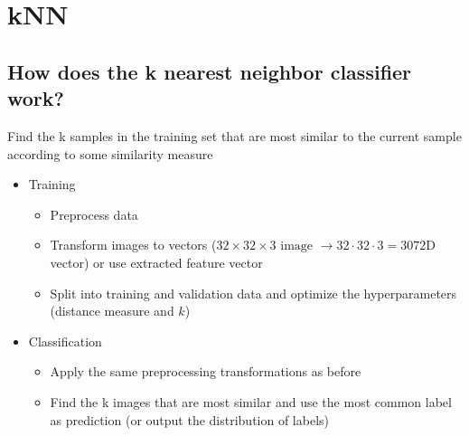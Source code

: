 %
\section{kNN}
\subsection{How does the k nearest neighbor classifier work?}
Find the k samples in the training set that are most similar to the current sample according to some similarity measure

\begin{itemize}
\item Training
\begin{itemize}
\item Preprocess data 
\item Transform images to vectors ($32\times 32\times 3 \text{ image }\to 32\cdot 32\cdot 3 = 3072$D vector) or use extracted feature vector
\item Split into training and validation data and optimize the hyperparameters (distance measure and $k$)
\end{itemize}
\item Classification
\begin{itemize}
\item Apply the same preprocessing  transformations as before
\item Find the k images that are most similar and use the most common label as prediction (or output the distribution of labels)
\end{itemize}
\end{itemize}

